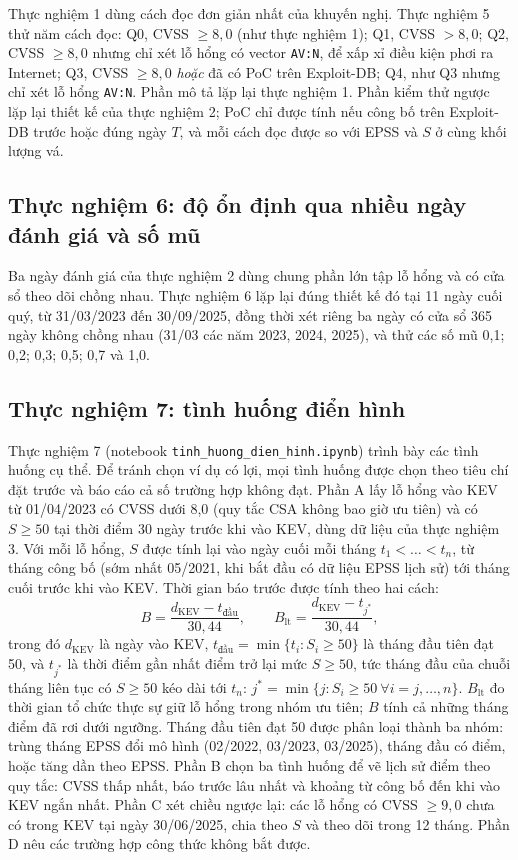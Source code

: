 \documentclass[runningheads]{llncs}
\begin{document}
Thực nghiệm 1 dùng cách đọc đơn giản nhất của khuyến nghị. Thực nghiệm 5 thử năm cách đọc:
Q0, CVSS $\ge 8{,}0$ (như thực nghiệm 1); Q1, CVSS $> 8{,}0$; Q2, CVSS $\ge 8{,}0$ nhưng chỉ xét
lỗ hổng có vector \texttt{AV:N}, để xấp xỉ điều kiện phơi ra Internet; Q3, CVSS
$\ge 8{,}0$ \emph{hoặc} đã có PoC trên Exploit-DB; Q4, như Q3 nhưng chỉ xét lỗ hổng
\texttt{AV:N}. Phần mô tả lặp lại thực nghiệm 1. Phần kiểm thử ngược lặp lại thiết kế của thực
nghiệm 2; PoC chỉ được tính nếu công bố trên Exploit-DB trước hoặc đúng ngày $T$, và mỗi cách
đọc được so với EPSS và $S$ ở cùng khối lượng vá.

\subsection{Thực nghiệm 6: độ ổn định qua nhiều ngày đánh giá và số mũ}

Ba ngày đánh giá của thực nghiệm 2 dùng chung phần lớn tập lỗ hổng và có cửa sổ theo dõi chồng
nhau. Thực nghiệm 6 lặp lại đúng thiết kế đó tại 11 ngày cuối quý, từ 31/03/2023 đến
30/09/2025, đồng thời xét riêng ba ngày có cửa sổ 365 ngày không chồng nhau (31/03 các năm 2023, 2024,
2025), và thử các số mũ 0,1; 0,2; 0,3; 0,5; 0,7 và 1,0.

\subsection{Thực nghiệm 7: tình huống điển hình}

Thực nghiệm 7 (notebook \texttt{tinh\_huong\_dien\_hinh.ipynb}) trình bày các tình huống cụ thể.
Để tránh chọn ví dụ có lợi, mọi tình huống được chọn theo tiêu chí đặt trước và báo cáo cả số
trường hợp không đạt. Phần A lấy lỗ hổng vào KEV từ 01/04/2023 có CVSS dưới 8,0 (quy tắc CSA
không bao giờ ưu tiên) và có $S \ge 50$ tại thời điểm 30 ngày trước khi vào KEV, dùng dữ liệu của thực nghiệm 3.
Với mỗi lỗ hổng, $S$ được tính lại vào ngày cuối mỗi tháng $t_1 < \dots < t_n$, từ tháng công
bố (sớm nhất 05/2021, khi bắt đầu có dữ liệu EPSS lịch sử) tới tháng cuối trước khi vào KEV. Thời gian
báo trước được tính theo hai cách:
\begin{equation}
B = \frac{d_{\mathrm{KEV}} - t_{\text{đầu}}}{30{,}44}, \qquad
B_{\text{lt}} = \frac{d_{\mathrm{KEV}} - t_{j^*}}{30{,}44},
\end{equation}
trong đó $d_{\mathrm{KEV}}$ là ngày vào KEV, $t_{\text{đầu}} = \min \lbrace t_i : S_i \ge 50
\rbrace$ là tháng đầu tiên đạt 50, và $t_{j^*}$ là thời điểm gần nhất điểm trở lại mức $S \ge 50$, tức tháng
đầu của chuỗi tháng liên tục có $S \ge 50$ kéo dài tới $t_n$: $j^* = \min \lbrace j : S_i \ge
50\ \forall i = j, \dots, n \rbrace$. $B_{\text{lt}}$ đo thời gian tổ chức thực sự giữ lỗ hổng
trong nhóm ưu tiên; $B$ tính cả những tháng điểm đã rơi dưới ngưỡng. Tháng đầu tiên đạt 50 được
phân loại thành ba nhóm: trùng tháng EPSS đổi mô hình (02/2022, 03/2023, 03/2025), tháng đầu có điểm, hoặc
tăng dần theo EPSS. Phần B chọn ba tình huống để vẽ lịch sử điểm theo quy tắc: CVSS thấp nhất,
báo trước lâu nhất và khoảng từ công bố đến khi vào KEV ngắn nhất. Phần C xét chiều ngược lại:
các lỗ hổng có CVSS $\ge 9{,}0$ chưa có trong KEV tại ngày 30/06/2025, chia theo $S$ và theo dõi trong 12 tháng.
Phần D nêu các trường hợp công thức không bắt được.
\end{document}
